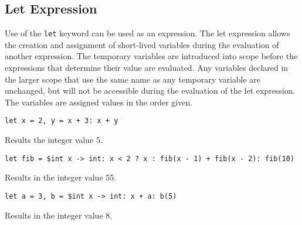 
\subsection{Let Expression}
{
	Use of the \texttt{let} keyword can be used as an expression.
	The let expression allows the creation and assignment
	of short-lived variables
	during the evaluation of another expression.
	The temporary variables are introduced into scope before the expressions
	that determine their value are evaluated.
	Any variables declared in the larger scope that use the same name as
	any temporary variable are unchanged, but will not be accessible during
	the evaluation of the let expression.
	The variables are assigned values in the order given.
	
	\begin{itemize}
	{
		\item \texttt{let x = 2, y = x + 3: x + y}
		
			Results the integer value 5.
		
		\item \texttt{let fib = \$int x -> int: x < 2 ? x : fib(x - 1) + fib(x - 2): fib(10)}
		
			Results in the integer value 55.
		
		\item \texttt{let a = 3, b = \$int x -> int: x + a: b(5)}
		
			Results in the integer value 8.
	}
	\end{itemize}
}
